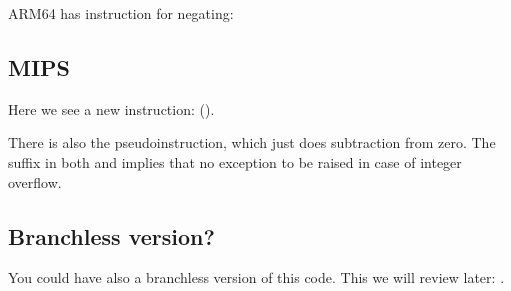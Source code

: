 ARM64 has instruction  for negating:


\fi

\ifdefined\IncludeMIPS
\subsection{MIPS}



Here we see a new instruction:  ().

There is also the  pseudoinstruction, which just does subtraction from zero.
The  suffix in both  and  implies that no exception to be raised in case of integer overflow.

\fi

\subsection{Branchless version?}

You could have also a branchless version of this code. This we will review later: .
